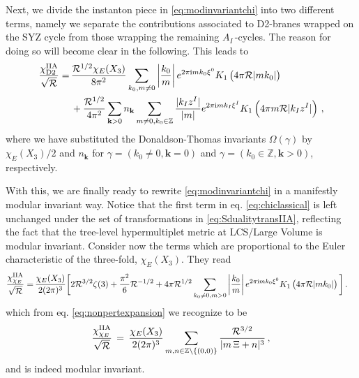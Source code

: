 Next, we divide the instanton piece in \eqref{eq:modinvariantchi} into two different terms, namely we separate the contributions associated to D2-branes wrapped on the SYZ cycle from those wrapping the remaining $A_I$\,-cycles. The reason for doing so will become clear in the following. This leads to
%
\begin{align}\label{eq:chiD2}
	\frac{\chi^{\rm IIA}_{\text{D2}}}{\sqrt{\mathcal{R}}} =\, &\frac{\mathcal{R}^{1/2} \chi_{E}(X_3)}{8\pi^2} \sum_{k_0, m \neq 0} \left| \frac{k_0}{m}\right| e^{ 2\pi \text{i} m k_0 \xi^0} K_1 \left( 4\pi \mathcal{R}|m k_0|\right)\notag\\
	&+ \frac{\mathcal{R}^{1/2}}{4\pi^2} \sum_{\textbf{k}>0} n_{\textbf{k}} \sum_{m\neq0, k_0 \in \mathbb{Z}} \frac{|k_I z^I|}{|m|} e^{ 2\pi \text{i} m k_I \xi^I} K_1 \left( 4\pi m \mathcal{R}|k_I z^I|\right)\, ,
\end{align}
%
where we have substituted the Donaldson-Thomas invariants $\Omega(\gamma)$ by $\chi_{E}(X_3)/2$ and $n_{\textbf{k}}$ for $\gamma = \left(k_0 \neq 0, \textbf{k}=0 \right)$ and $\gamma = \left(k_0 \in \mathbb{Z}, \textbf{k} > 0 \right)$, respectively. 
	
With this, we are finally ready to rewrite \eqref{eq:modinvariantchi} in a manifestly modular invariant way. Notice that the first term in eq. \eqref{eq:chiclassical} is left unchanged under the set of transformations in \eqref{eq:SdualitytransIIA}, reflecting the fact that the tree-level hypermultiplet metric at LCS/Large Volume is modular invariant. Consider now the terms which are proportional to the Euler characteristic of the three-fold, $\chi_{E}(X_3)$. They read
%
\begin{align}\label{eq:chiEuler}
	\frac{\chi^{\rm IIA}_{\chi_{E}}}{\sqrt{\mathcal{R}}} =\, &\frac{\chi_{E}(X_3)}{2(2\pi)^3} \bigg[ 2\mathcal{R}^{3/2} \zeta(3) + \frac{\pi^2}{6} \mathcal{R}^{-1/2} + 4\pi \mathcal{R}^{1/2} \sum_{k_0 \neq 0, m > 0} \left| \frac{k_0}{m}\right| e^{ 2\pi \text{i} m k_0 \xi^0} K_1 \left( 4\pi \mathcal{R}|m k_0|\right) \bigg]\, .
\end{align}
%
which from eq. \eqref{eq:nonpertexpansion} we recognize to be
%
\begin{align}\label{eq:chiEulerII}
	\frac{\chi^{\rm IIA}_{\chi_{E}}}{\sqrt{\mathcal{R}}}\, =\, \frac{\chi_{E}(X_3)}{2(2\pi)^3} \sum_{m, n \in \mathbb{Z}\setminus \lbrace (0,0) \rbrace} \frac{\mathcal{R}^{3/2}}{|m\, \Xi +n|^3}\, ,
\end{align}
%
and is indeed modular invariant.
	
